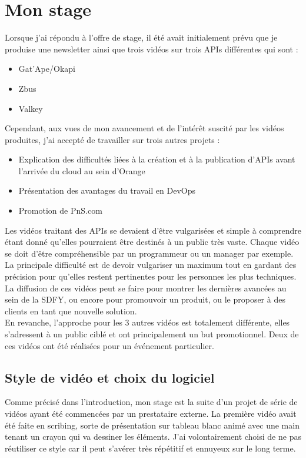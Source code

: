 \chapter{Mon stage}
\label{sec:unchapitre}

Lorsque j'ai répondu à l'offre de stage, il été avait initialement prévu que je produise une newsletter ainsi que trois vidéos sur trois APIs différentes qui sont :

\begin{itemize}
    \item Gat'Ape/Okapi
    \item Zbus
    \item Valkey
\end{itemize}

Cependant, aux vues de mon avancement et de l'intérêt suscité par les vidéos produites, j'ai accepté de travailler sur trois autres projets :

\begin{itemize}
    \item Explication des difficultés liées à la création et à la publication d'APIs avant l'arrivée du cloud au sein d'Orange
    \item Présentation des avantages du travail en DevOps
    \item Promotion de PnS.com
\end{itemize}



Les vidéos traitant des APIs se devaient d'être vulgarisées et simple à comprendre étant donné qu'elles pourraient être destinés à un public très vaste. Chaque vidéo se doit d'être compréhensible par un programmeur ou un manager par exemple. La principale difficulté est de devoir vulgariser un maximum tout en gardant des précision pour qu'elles restent pertinentes pour les personnes les plus techniques. La diffusion de ces vidéos peut se faire pour montrer les dernières avancées au sein de la SDFY, ou encore pour promouvoir un produit, ou le proposer à des clients en tant que nouvelle solution. \\

En revanche, l'approche pour les 3 autres vidéos est totalement différente, elles s'adressent à un public ciblé et ont principalement un but promotionnel. Deux de ces vidéos ont été réalisées pour un événement particulier. \\



\section{Style de vidéo et choix du logiciel}
Comme précisé dans l'introduction, mon stage est la suite d'un projet de série de vidéos ayant été commencées par un prestataire externe. La première vidéo avait été faite en scribing, sorte de présentation sur tableau blanc animé avec une main tenant un crayon qui va dessiner les éléments. J'ai volontairement choisi de ne pas réutiliser ce style car il peut s'avérer très répétitif et ennuyeux sur le long terme.

